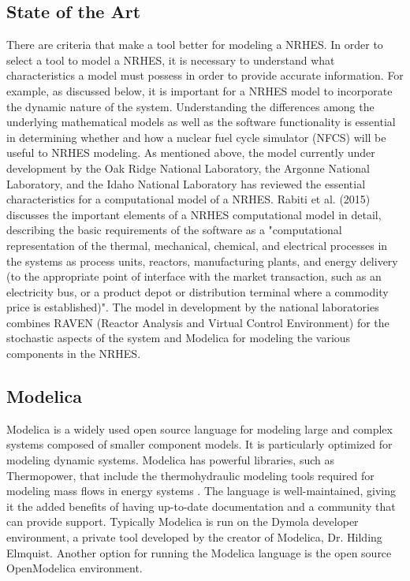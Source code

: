 \documentclass{article}                                                                           %
\begin{document}
\begin{linenumbers}
\section{State of the Art}
There are criteria that make a tool better for modeling a NRHES. In order to select a tool to model a NRHES, it is necessary to understand what characteristics a model must possess in order to provide accurate information. For example, as discussed below, it is important for a NRHES model to incorporate the dynamic nature of the system. Understanding the differences among the underlying mathematical models as well as the software functionality is essential in determining whether and how a nuclear fuel cycle simulator (NFCS) will be useful to NRHES modeling.
As mentioned above, the model currently under development by the Oak Ridge National Laboratory, the Argonne National Laboratory, and the Idaho National Laboratory has reviewed the essential characteristics for a computational model of a NRHES. Rabiti et al. (2015) discusses the important elements of a NRHES computational model in detail, describing the basic requirements of the software as a "computational representation of the thermal, mechanical, chemical, and electrical processes in the systems as process units, reactors, manufacturing plants, and energy delivery (to the appropriate point of interface with the market transaction, such as an electricity bus, or a product depot or distribution terminal where a commodity price is established)"\cite{Rabiti2015}. The model in development by the national laboratories combines RAVEN (Reactor Analysis and Virtual Control Environment) for the stochastic aspects of the system and Modelica for modeling the various components in the NRHES.

\subsection{Modelica}
Modelica is a widely used open source language for modeling large and complex systems composed of smaller component models. It is particularly optimized for modeling dynamic systems. Modelica has powerful libraries, such as Thermopower, that include the thermohydraulic modeling tools required for modeling mass flows in energy systems \cite{Binder2014}. The language is well-maintained, giving it the added benefits of having up-to-date documentation and a community that can provide support. Typically Modelica is run on the Dymola developer environment, a private tool developed by the creator of Modelica, Dr. Hilding Elmquist. Another option for running the Modelica language is the open source OpenModelica environment.


\end{linenumbers}
\end{document}
